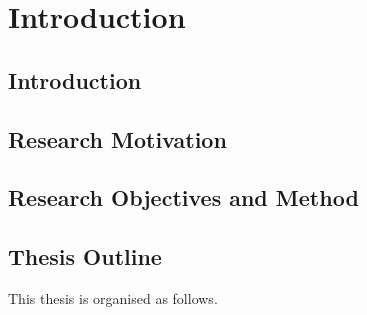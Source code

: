 %


\chapter{Introduction}
\label{chap:intro}


\section{Introduction}

\section{Research Motivation}


\section{Research Objectives and Method}


\section{Thesis Outline}

This thesis is organised as follows.
